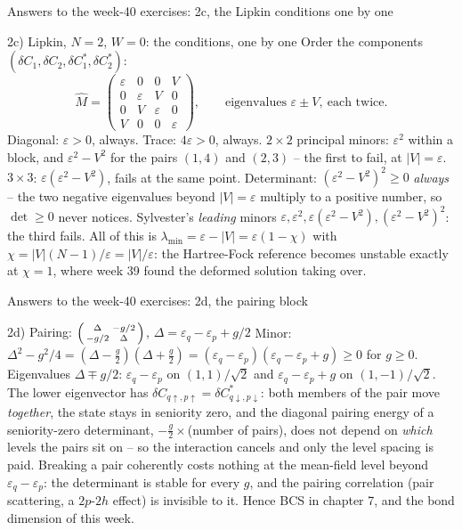 \documentclass[aspectratio=169,10pt]{beamer}
\begin{document}
\begin{frame}{Answers to the week-40 exercises: 2c, the Lipkin conditions one by one}
  \footnotesize
  \begin{block}{2c) Lipkin, $N=2$, $W=0$: the conditions, one by one}
    Order the components $(\delta C_1,\delta C_2,\delta C_1^{*},\delta C_2^{*})$:
    \[
      \hat M=\begin{pmatrix}\varepsilon&0&0&V\\0&\varepsilon&V&0\\0&V&\varepsilon&0\\V&0&0&\varepsilon\end{pmatrix},
      \qquad \text{eigenvalues } \varepsilon\pm V,\ \text{each twice.}
    \]
    Diagonal: $\varepsilon>0$, always. Trace: $4\varepsilon>0$, always. $2\times2$ principal minors: $\varepsilon^2$ within a block, and $\varepsilon^2-V^2$ for the pairs $(1,4)$ and $(2,3)$ -- \alert{the first to fail}, at $|V|=\varepsilon$. $3\times3$: $\varepsilon(\varepsilon^2-V^2)$, fails at the same point. Determinant: $(\varepsilon^2-V^2)^2\ge0$ \emph{always} -- the two negative eigenvalues beyond $|V|=\varepsilon$ multiply to a positive number, so $\det\ge0$ never notices. Sylvester's \emph{leading} minors $\varepsilon,\varepsilon^2,\varepsilon(\varepsilon^2-V^2),(\varepsilon^2-V^2)^2$: the third fails. All of this is $\lambda_{\min}=\varepsilon-|V|=\varepsilon(1-\chi)$ with $\chi=|V|(N-1)/\varepsilon=|V|/\varepsilon$: the Hartree-Fock reference becomes unstable exactly at $\chi=1$, where week 39 found the deformed solution taking over.
  \end{block}
\end{frame}

\begin{frame}{Answers to the week-40 exercises: 2d, the pairing block}
  \footnotesize
  \begin{block}{2d) Pairing: $\begin{psmallmatrix}\Delta&-g/2\\-g/2&\Delta\end{psmallmatrix}$, $\Delta=\varepsilon_q-\varepsilon_p+g/2$}
    Minor: $\Delta^2-g^2/4=(\Delta-\tfrac g2)(\Delta+\tfrac g2)=(\varepsilon_q-\varepsilon_p)(\varepsilon_q-\varepsilon_p+g)\ge0$ for $g\ge0$. Eigenvalues $\Delta\mp g/2$: $\varepsilon_q-\varepsilon_p$ on $(1,1)/\sqrt2$ and $\varepsilon_q-\varepsilon_p+g$ on $(1,-1)/\sqrt2$. The lower eigenvector has $\delta C_{q\uparrow,p\uparrow}=\delta C^{*}_{q\downarrow,p\downarrow}$: both members of the pair move \emph{together}, the state stays in seniority zero, and the diagonal pairing energy of a seniority-zero determinant, $-\frac g2\times$(number of pairs), does not depend on \emph{which} levels the pairs sit on -- so the interaction cancels and only the level spacing is paid. Breaking a pair coherently costs nothing at the mean-field level beyond $\varepsilon_q-\varepsilon_p$: the determinant is stable for every $g$, and the pairing correlation (pair scattering, a $2p$-$2h$ effect) is invisible to it. Hence BCS in chapter 7, and the bond dimension of this week.
  \end{block}
\end{frame}
\end{document}

